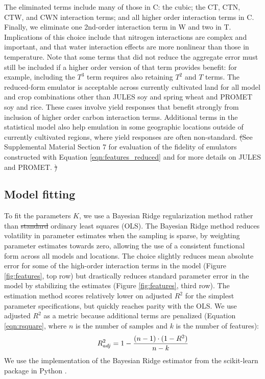 \documentclass[gmdd]{copernicus} %
\providecommand{\DIFadd}[1]{{\protect\color{blue}\uwave{#1}}} %
\providecommand{\DIFdel}[1]{{\protect\color{red}\sout{#1}}}                      %
\providecommand{\DIFaddbegin}{} %
\providecommand{\DIFaddend}{} %
\providecommand{\DIFdelbegin}{} %
\providecommand{\DIFdelend}{} %
\begin{document}
\noindent The eliminated terms include many of those in C: the cubic; the CT, CTN, CTW, and CWN interaction terms; and all higher order interaction terms in C. 
Finally, we eliminate one 2nd-order interaction term in W and two in T. 
Implications of this choice include that nitrogen interactions are complex and important, and that water interaction effects are more nonlinear than those in temperature.  
Note that some terms that did not reduce the aggregate error must still be included if a higher order version of that term provides benefit: for example, including the $T^3$ term requires also retaining $T^2$ and $T$ terms. 
The reduced-form emulator is acceptable across currently cultivated land for all model and crop combinations other than JULES soy and spring wheat and PROMET soy and rice.
These cases involve yield responses that benefit strongly from inclusion of higher order carbon \DIFaddbegin \DIFadd{dioxide }\DIFaddend interaction terms. 
Additional terms in the statistical model also help emulation in some geographic locations outside of currently cultivated regions, where yield responses are often non-standard. 
\DIFdelbegin \DIFdel{(}\DIFdelend See Supplemental Material Section 7 for evaluation of the fidelity of emulators constructed with Equation \ref{eqn:features_reduced} and for more details on JULES and PROMET.
\DIFdelbegin \DIFdel{)
}\DIFdelend 

\subsection{Model fitting}
To fit the parameters $K$, we use a Bayesian Ridge regularization method \citep{MacKay91} rather than \DIFdelbegin \DIFdel{standard }\DIFdelend ordinary least squares (OLS). 
The Bayesian Ridge method reduces volatility in parameter estimates when the sampling is sparse, by weighting parameter estimates towards zero, allowing the use of a consistent functional form across all models and locations. 
The choice slightly reduces mean absolute error for some of the high-order interaction terms in the model (Figure \ref{fig:features}, top row) but drastically reduces standard parameter error in the model by stabilizing the estimates (Figure \ref{fig:features}, third row).
The estimation method scores relatively lower on adjusted $R^2$ for the simplest parameter specifications, but quickly reaches parity with the OLS. 
We use adjusted $R^2$ as a metric because additional terms are penalized (Equation \ref{eqn:rsquare}, where $n$ is the number of samples and $k$ is the number of features): 
\begin{equation}
    \centering
    \label{eqn:rsquare}
        \hspace{10mm} R^{2}_{adj} = 1 - \frac{(n-1) \cdot (1 - R^{2})}{n - k}
\end{equation}
We use the implementation of the Bayesian Ridge estimator from the scikit-learn package in Python \citep{scikit-learn}. 
\end{document}
